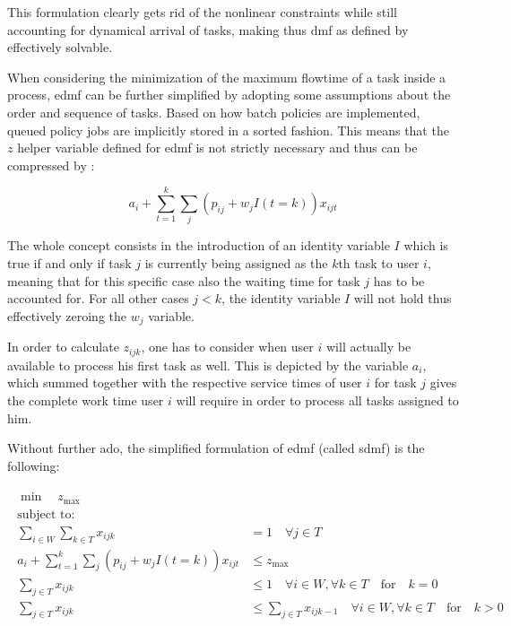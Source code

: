 This formulation clearly gets rid of the nonlinear constraints while still accounting for dynamical arrival of tasks, making thus \gls{dmf} as defined by \citet{Zeng2005} effectively solvable.

When considering the minimization of the maximum flowtime of a task inside a process, \gls{edmf} can be further simplified by adopting some assumptions about the order and sequence of tasks. Based on how batch policies are implemented, queued policy jobs are implicitly stored in a sorted fashion. This means that the $z$ helper variable defined for \gls{edmf} is not strictly necessary and thus can be compressed by :

\begin{equation}
\label{eq:simplified_z_with_k}
	a_i + \sum_{t=1}^k \sum_j (p_{ij} + w_j I(t=k))x_{ijt}
\end{equation}

The whole concept consists in the introduction of an identity variable $I$ which is true if and only if task $j$ is currently being assigned as the $k$th task to user $i$, meaning that for this specific case also the waiting time for task $j$ has to be accounted for. For all other cases \ie $j<k$, the identity variable $I$ will not hold thus effectively zeroing the $w_j$ variable.

In order to calculate $z_{ijk}$, one has to consider when user $i$ will actually be available to process his first task as well. This is depicted by the variable $a_i$, which summed together with the respective service times of user $i$ for task $j$ gives the complete work time user $i$ will require in order to process all tasks assigned to him.

Without further ado, the simplified formulation of \gls{edmf} (called \gls{sdmf}) is the following:

\begin{align}
	\begin{split}
	    \min \quad z_{\text{max}}\\
	    \text{subject to:} \\
	    \sum_{i \in W} \sum_{k \in T} x_{ijk} &= 1 \quad \forall j \in T\\
	    a_i + \sum_{t=1}^k \sum_j (p_{ij} + w_j I(t=k))x_{ijt} &\leq z_{\text{max}}\\
	    \sum_{j \in T} x_{ijk} &\leq 1 \quad \forall i \in W, \forall k \in T \quad \text{for} \quad k=0\\
	    \sum_{j \in T} x_{ijk} &\leq \sum_{j \in T} x_{ijk-1} \quad \forall i \in W, \forall k \in T \quad \text{for} \quad k>0
	\end{split}
\end{align}

